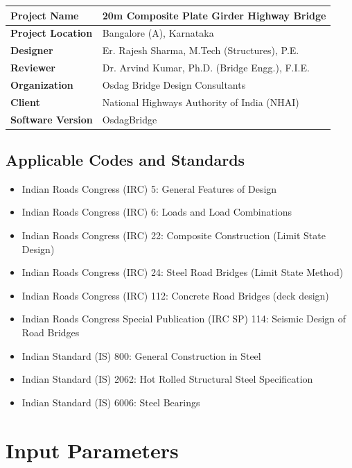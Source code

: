 \documentclass[12pt,a4paper]{report}
\numberwithin{table}{chapter}
\numberwithin{figure}{chapter}
\begin{document}
\begin{tabular}{|L{5.5cm}|L{8.5cm}|}
\hline
\textbf{Project Name} & 20m Composite Plate Girder Highway Bridge \\
\hline
\textbf{Project Location} & Bangalore (A), Karnataka \\
\hline
\textbf{Designer} & Er. Rajesh Sharma, M.Tech (Structures), P.E. \\
\hline
\textbf{Reviewer} & Dr. Arvind Kumar, Ph.D. (Bridge Engg.), F.I.E. \\
\hline
\textbf{Organization} & Osdag Bridge Design Consultants \\
\hline
\textbf{Client} & National Highways Authority of India (NHAI) \\
\hline
\textbf{Software Version} & OsdagBridge \\
\hline
\end{tabular}


\section{Applicable Codes and Standards}
\label{sec:codes}

\begin{itemize}
\item Indian Roads Congress (IRC) 5: General Features of Design
\item Indian Roads Congress (IRC) 6: Loads and Load Combinations
\item Indian Roads Congress (IRC) 22: Composite Construction (Limit State Design)
\item Indian Roads Congress (IRC) 24: Steel Road Bridges (Limit State Method)
\item Indian Roads Congress (IRC) 112: Concrete Road Bridges (deck design)
\item Indian Roads Congress Special Publication (IRC SP) 114: Seismic Design of Road Bridges
\item Indian Standard (IS) 800: General Construction in Steel
\item Indian Standard (IS) 2062: Hot Rolled Structural Steel Specification
\item Indian Standard (IS) 6006: Steel Bearings
\end{itemize}


\chapter{Input Parameters}

\setlength{\abovecaptionskip}{2pt}
\setlength{\belowcaptionskip}{2pt}
\end{document}
